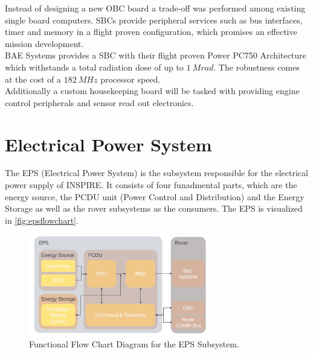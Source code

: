 Instead of designing a new OBC board a trade-off was performed among existing single board computers. SBCs provide peripheral services such as bus interfaces, timer and memory in a flight proven configuration, which promises an effective mission development. \\

BAE Systems provides a SBC with their flight proven Power PC750 Architecture which withstands a total radiation dose of up to $1\ Mrad$. The robustness comes at the cost of a $182\ MHz$ processor speed. \\

Additionally a custom housekeeping board will be tasked with providing engine control peripherals and sensor read out electronics. 
 
\clearpage


\section{Electrical Power System}
\label{sec:EPS}
The EPS (Electrical Power System) is the subsystem responsible for the electrical power supply of INSPIRE. It consists of four funadmental parts, which are the energy source, the PCDU unit (Power Control and Distribution) and the Energy Storage as well as the rover subsystems as the consumers. The EPS is visualized in \autoref{fig:epsflowchart}.

\begin{figure}[htb]
{\centering
\includegraphics[width=0.7\textwidth]{Media/epsflowchart}
\caption{Functional Flow Chart Diagram for the EPS Subsystem.}
\label{fig:epsflowchart}
}
\end{figure}



